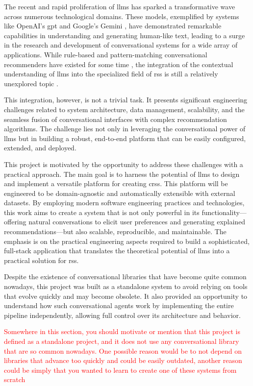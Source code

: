The recent and rapid proliferation of \acp{llm} has sparked a transformative wave across numerous technological domains. These models, exemplified by systems like OpenAI's \ac{gpt} \cite{CHATGPT} and Google's Gemini \cite{GEMINI}, have demonstrated remarkable capabilities in understanding and generating human-like text, leading to a surge in the research and development of conversational systems for a wide array of applications. While rule-based and pattern-matching conversational recommenders have existed for some time \cite{SOTA-CRS}, the integration of the contextual understanding of \acp{llm} into the specialized field of \acl{rs}s is still a relatively unexplored topic \cite{SOTA-CRS-LLM}.

This integration, however, is not a trivial task. It presents significant engineering challenges related to system architecture, data management, scalability, and the seamless fusion of conversational interfaces with complex recommendation algorithms. The challenge lies not only in leveraging the conversational power of \acp{llm} but in building a robust, end-to-end platform that can be easily configured, extended, and deployed.

This project is motivated by the opportunity to address these challenges with a practical approach. The main goal is to harness the potential of \acp{llm} to design and implement a versatile platform for creating \acp{crs}. This platform will be engineered to be domain-agnostic and automatically extensible with external datasets. By employing modern software engineering practices and technologies, this work aims to create a system that is not only powerful in its functionality---offering natural conversations to elicit user preferences \cite[Conversational Preference Elicitation]{CHAPTER:RS-HANDBOOK-NLP} and generating explained recommendations---but also scalable, reproducible, and maintainable. The emphasis is on the practical engineering aspects required to build a sophisticated, full-stack application that translates the theoretical potential of \acp{llm} into a practical solution for \acl{rs}s.

Despite the existence of conversational libraries that have become quite common nowadays, this project was built as a standalone system to avoid relying on tools that evolve quickly and may become obsolete. It also provided an opportunity to understand how such conversational agents work by implementing the entire pipeline independently, allowing full control over its architecture and behavior.

\textcolor{red}{Somewhere in this section, you should motivate or mention that this project is defined as a standalone project, and it does not use any conversational library that are so common nowadays. One possible reason would be to not depend on libraries that advance too quickly and could be easily outdated, another reason could be simply that you wanted to learn to create one of these systems from scratch}
